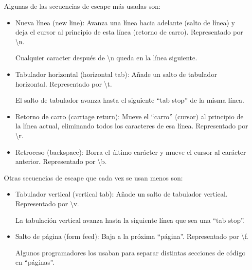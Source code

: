 \documentclass{report}
\newcommand{\doble}[1]{``#1''}
\begin{document}
Algunas de las secuencias de escape más usadas son:

\begin{itemize}
  \item Nueva línea (new line): Avanza una línea hacia adelante (salto de línea) y deja el cursor al principio de esta línea (retorno de carro). Representado por \textbackslash n.
  
  
  Cualquier caracter después de \textbackslash n queda en la línea siguiente.

  \item Tabulador horizontal (horizontal tab): Añade un salto de tabulador horizontal. Representado por \textbackslash t.
  
  
  El salto de tabulador avanza hasta el siguiente \doble{tab stop} de la misma línea.

  \item Retorno de carro (carriage return): Mueve el \doble{carro} (cursor) al principio de la línea actual, eliminando todos los caracteres de esa línea. Representado por \textbackslash r.
  

  \item Retroceso (backspace): Borra el último carácter y mueve el cursor al carácter anterior. Representado por \textbackslash b.
  

\end{itemize}

Otras secuencias de escape que cada vez se usan menos son:

\begin{itemize}
  \item Tabulador vertical (vertical tab): Añade un salto de tabulador vertical. Representado por \textbackslash v.
  

  La tabulación vertical avanza hasta la siguiente línea que sea una \doble{tab stop}.

  \item Salto de página (form feed): Baja a la próxima \doble{página}. Representado por \textbackslash f.
  
  
  Algunos programadores los usaban para separar distintas secciones de código en \doble{páginas}.

\end{itemize}
\end{document}
